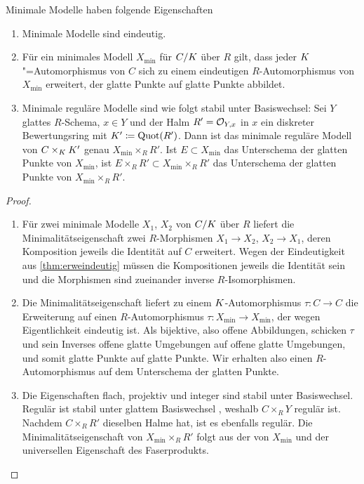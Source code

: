 \documentclass[german]{scrreprt}
\begin{document}
\begin{Satz}\label{thm:eigminmodell}
  Minimale Modelle haben folgende Eigenschaften
  \begin{enumerate}[label=(\roman*)]
  \item Minimale Modelle sind eindeutig.
  \item{}
    Für ein minimales Modell $X_{\text{min}}$ für $C/K$ über $R$
    gilt, dass jeder $K$"=Automorphismus von $C$ sich zu
    einem eindeutigen $R$-Automorphismus von $X_{\text{min}}$
    erweitert, der glatte Punkte auf glatte Punkte abbildet.
  \item\cite[vgl.][Beweis von Proposition IV.6.10]{silverman2}
    Minimale reguläre Modelle sind wie folgt stabil unter Basiswechsel:
    Sei $Y$ glattes $R$-Schema, $x\in Y$ und der Halm $R'=\mathcal{O}_{Y,x}$ in
    $x$  ein diskreter Bewertungsring mit $K'\coloneqq\operatorname{Quot}(R')$.
    Dann ist das minimale reguläre Modell von $C\times_{K}K'$ genau
    $X_{\text{min}}\times_R R'$.
    Ist $E\subset X_{\text{min}}$ das Unterschema der glatten Punkte
    von $X_{\text{min}}$, ist
    $E\times_R R'\subset X_{\text{min}}\times_R R'$ das Unterschema
    der glatten Punkte von $X_{\text{min}}\times_R R'$.
  \end{enumerate}
  \begin{proof}
    \begin{enumerate}[label=(\roman*)]
    \item Für zwei minimale Modelle $X_1$, $X_2$ von $C/K$ über $R$
      liefert die Minimalitätseigenschaft zwei $R$-Morphismen
      $X_1\to X_2$, $X_2\to X_1$, deren Komposition jeweils die
      Identität auf $C$ erweitert. Wegen der Eindeutigkeit aus
      \ref{thm:erweindeutig} müssen die Kompositionen jeweils die
      Identität sein und die Morphismen sind zueinander inverse
      $R$-Isomorphismen.
    \item Die Minimalitätseigenschaft liefert zu einem
      $K$-Automorphismus $\tau\colon C\to C$ die Erweiterung auf
      einen $R$-Automorphismus
      $\tau\colon X_{\text{min}}\to X_{\text{min}}$, der wegen
      Eigentlichkeit eindeutig ist.
      Als bijektive, also offene Abbildungen, schicken $\tau$ und
      sein Inverses offene glatte Umgebungen auf offene glatte
      Umgebungen, und somit glatte Punkte auf glatte Punkte. Wir
      erhalten also einen $R$-Automorphismus auf dem Unterschema der
      glatten Punkte.
    \item Die Eigenschaften flach, projektiv und integer sind stabil
      unter Basiswechsel. Regulär ist stabil unter glattem
      Basiswechsel \cite[Chapter 2.3, Page 49]{neron}, weshalb
      $C\times_R Y$ regulär ist.
      Nachdem $C\times_R R'$ dieselben Halme hat, ist es ebenfalls
      regulär.
      Die Minimalitätseigenschaft von $X_{\text{min}}\times_R R'$
      folgt aus der von $X_{\text{min}}$ und der universellen
      Eigenschaft des Faserprodukts.
      

\end{enumerate}
\end{proof}
\end{Satz}
\end{document}
